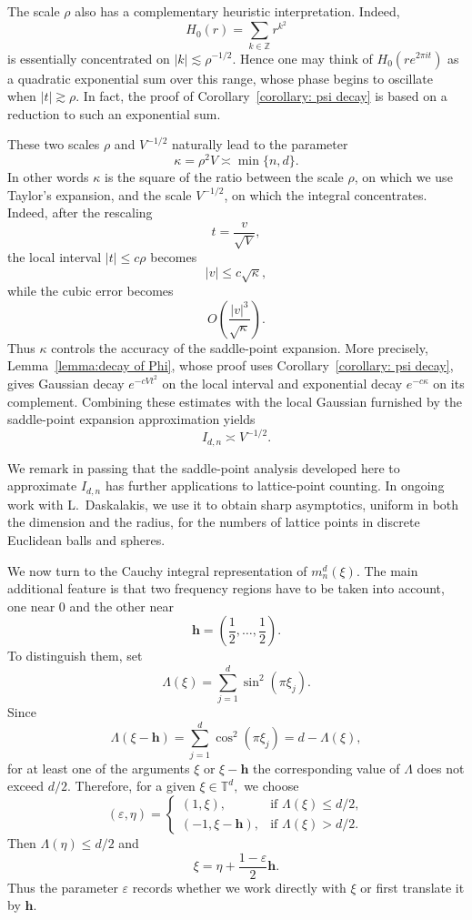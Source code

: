 \documentclass{article}
\newcommand{\Z}{\mathbb Z}
\newcommand{\T}{\mathbb T}
\theoremstyle{plain}
\numberwithin{equation}{section}
\begin{document}
The scale $\rho$ also has a complementary heuristic interpretation. Indeed,
\[
H_0(r)=\sum_{k\in\Z}r^{k^2}
\]
is essentially concentrated on \(|k|\lesssim\rho^{-1/2}\). Hence one
may think of \(H_0(re^{2\pi it})\) as a quadratic exponential sum over
this range, whose phase begins to oscillate when
\(|t|\gtrsim\rho\). In fact, the proof of
Corollary~\ref{corollary: psi decay} is based on a reduction to such
an exponential sum.

These two scales $\rho$ and $V^{-1/2}$ naturally lead to the parameter
\[
\kappa=\rho^2V\asymp\min\{n,d\}.
\]
In other words $\kappa$ is the square of the ratio between the scale \(\rho\), on which we
use Taylor's expansion, and the scale \(V^{-1/2}\), on which the
integral concentrates. Indeed, after the rescaling
\[
t=\frac{v}{\sqrt V},
\]
the local interval \(|t|\leq c\rho\) becomes
\[
|v|\leq c\sqrt\kappa,
\]
while the cubic error becomes
\[
O\left(\frac{|v|^3}{\sqrt\kappa}\right).
\]
Thus \(\kappa\) controls the accuracy of the saddle-point expansion.
More precisely, Lemma~\ref{lemma:decay of Phi}, whose proof uses
Corollary~\ref{corollary: psi decay}, gives Gaussian decay
\(e^{-cVt^2}\) on the local interval and exponential decay
\(e^{-c\kappa}\) on its complement. Combining these estimates with
the local Gaussian furnished by the saddle-point expansion approximation yields
\[
I_{d,n}\asymp V^{-1/2}.
\]


We remark in passing that the saddle-point analysis developed here to approximate $I_{d,n}$ has further applications to
lattice-point counting. In ongoing work with L.\ Daskalakis, we use it to
obtain sharp asymptotics, uniform in both the dimension and the radius, for
the numbers of lattice points in discrete Euclidean balls and spheres.


We now turn to the Cauchy integral representation of \(m_n^d(\xi)\).
The main additional feature is that two frequency regions have to be taken into
account, one near $0$ and the other near
\[
\mathbf h=\left(\frac12,\ldots,\frac12\right).
\]
To distinguish them, set
\[
\Lambda(\xi)
=
\sum_{j=1}^d\sin^2(\pi\xi_j).
\]
Since
\[
\Lambda(\xi-\mathbf h)
=
\sum_{j=1}^d\cos^2(\pi\xi_j)
=
d-\Lambda(\xi),
\]
for at least one of the arguments \(\xi\) or \(\xi-\mathbf h\) the corresponding value of
\(\Lambda\) does not exceed $d/2$. Therefore, for a given $\xi\in \T^d,$ we choose
\[
(\varepsilon,\eta)
=
\begin{cases}
(1,\xi),&\text{if }\Lambda(\xi)\leq d/2,\\
(-1,\xi-\mathbf h),&\text{if }\Lambda(\xi)>d/2.
\end{cases}
\]
Then \(\Lambda(\eta)\leq d/2\) and
\[
\xi=\eta+\frac{1-\varepsilon}{2}\mathbf h.
\]
Thus the parameter \(\varepsilon\) records whether we work directly with \(\xi\) or
first translate it by \(\mathbf h\).
\end{document}
